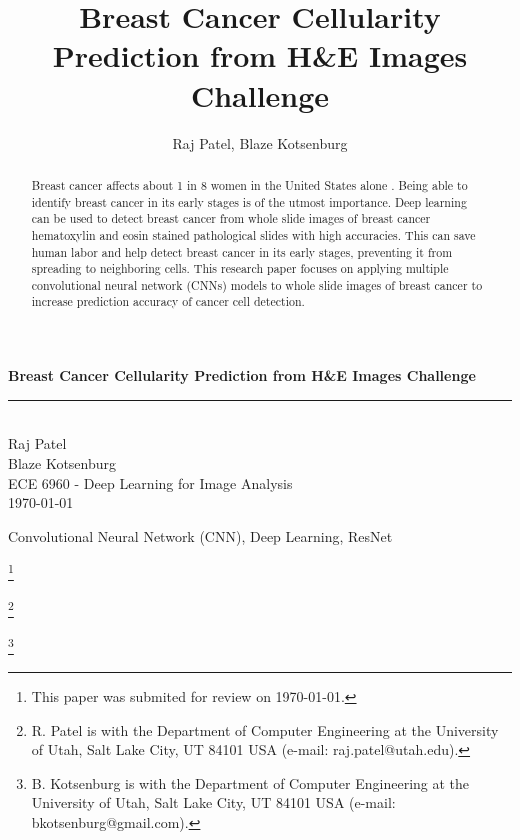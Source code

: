 \documentclass[11pt]{ieeeconf}
\title{Breast Cancer Cellularity Prediction from H\&E Images Challenge}
\author{Raj Patel, Blaze Kotsenburg}
\newcommand\blfootnote[1]{%
  \begingroup
  \renewcommand\thefootnote{}\footnote{#1}%
  \addtocounter{footnote}{-1}%
  \endgroup
}
\begin{document}
\begin{titlepage}
  \newcommand{\HRule}{\rule{\linewidth}{0.5mm}} %
  
  \vspace*{\fill}
  \center %
  
  { \huge \bfseries Breast Cancer Cellularity Prediction from H\&E Images Challenge}\\
  \HRule \\[1cm]

  \large Raj Patel\\
  \large Blaze Kotsenburg\\[1.5cm]

  \normalsize ECE 6960 - Deep Learning for Image Analysis\\
  \normalsize \today\\[4cm]
  
  \vspace*{\fill}
\end{titlepage}

\maketitle
\begin{abstract}
Breast cancer affects about 1 in 8 women in the United States alone \cite{web1}. Being able to identify breast cancer in its early stages is of the utmost importance. Deep learning can be used to detect breast cancer from whole slide images of breast cancer hematoxylin and eosin stained pathological slides with high accuracies. This can save human labor and help detect breast cancer in its early stages, preventing it from spreading to neighboring cells. This research paper focuses on applying multiple convolutional neural network (CNNs) models to whole slide images of breast cancer to increase prediction accuracy of cancer cell detection.
\end{abstract}

\begin{keywords}
  Convolutional Neural Network (CNN), Deep Learning, ResNet
\end{keywords}

\blfootnote{This paper was submited for review on \today.}
\blfootnote{R. Patel is with the Department of Computer Engineering at the University of Utah, Salt Lake City, UT 84101 USA (e-mail: raj.patel@utah.edu).}
\blfootnote{B. Kotsenburg is with the Department of Computer Engineering at the University of Utah, Salt Lake City, UT 84101 USA (e-mail: bkotsenburg@gmail.com).}
\end{document}
